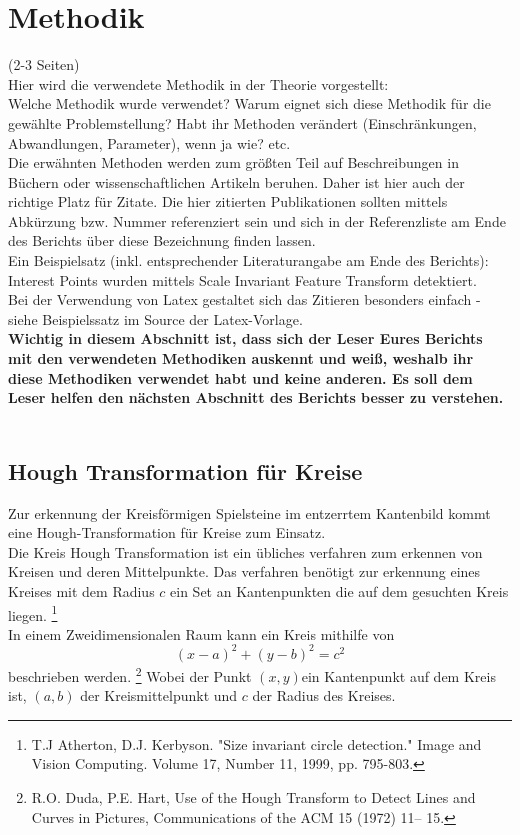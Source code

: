 \documentclass[paper=A4, deutsch]{scrartcl}
\begin{document}
\section{Methodik}
(2-3 Seiten)\\
Hier wird die verwendete Methodik in der Theorie vorgestellt:\\
Welche Methodik wurde verwendet? Warum eignet sich diese Methodik für die gewählte Problemstellung? Habt ihr Methoden verändert (Einschränkungen, Abwandlungen, Parameter), wenn ja wie? etc.\\
Die erwähnten Methoden werden zum größten Teil auf Beschreibungen in Büchern oder wissenschaftlichen Artikeln beruhen. Daher ist hier auch der richtige Platz für Zitate. Die hier zitierten Publikationen sollten mittels Abkürzung bzw. Nummer referenziert sein und sich in der Referenzliste am Ende des Berichts über diese Bezeichnung finden lassen.\\
Ein Beispielsatz (inkl. entsprechender Literaturangabe am Ende des Berichts): Interest Points wurden mittels Scale Invariant Feature Transform \cite{lowe2004} detektiert.\\
Bei der Verwendung von Latex gestaltet sich das Zitieren besonders einfach - siehe Beispielssatz im Source der Latex-Vorlage.\\
\textbf{Wichtig in diesem Abschnitt ist, dass sich der Leser Eures Berichts mit den verwendeten Methodiken auskennt und weiß, weshalb ihr diese Methodiken verwendet habt und keine anderen. Es soll dem Leser helfen den nächsten Abschnitt des Berichts besser zu verstehen.}
\\
\\
\subsection{Hough Transformation für Kreise}
Zur erkennung der Kreisförmigen Spielsteine im entzerrtem Kantenbild kommt eine Hough-Transformation für Kreise zum Einsatz. \\
Die Kreis Hough Transformation ist ein übliches verfahren zum erkennen von Kreisen und deren Mittelpunkte. Das verfahren benötigt zur erkennung eines Kreises mit dem Radius \(c\) ein Set an Kantenpunkten die auf dem gesuchten Kreis liegen. 
	\footnote{\label{houghnote2} T.J Atherton, D.J. Kerbyson. "Size invariant circle detection." Image and Vision Computing. 
	Volume 17, Number 11, 1999, pp. 795-803.}\\
In einem Zweidimensionalen Raum kann ein Kreis mithilfe von \\
\begin{equation}
(x - a)^2 +(y - b)^2 = c^2 
\end{equation} 
beschrieben werden. \footnote{\label{houghnote1}R.O. Duda, P.E. Hart, Use of the Hough Transform to Detect Lines and Curves in Pictures, Communications of the ACM 15 (1972) 11– 15.
} Wobei der Punkt \((x,y) \)ein Kantenpunkt auf dem Kreis ist, \((a,b)\) der Kreismittelpunkt und \(c\) der Radius des Kreises.\\
\end{document}
